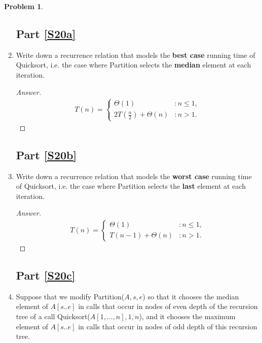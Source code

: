\documentclass[11pt]{article}
\theoremstyle{definition}
\theoremstyle{definition}
\newtheorem{required}{Problem}
\theoremstyle{definition}
\begin{document}
\begin{required}
\begin{enumerate}[label=(\alph*)]
\subsection{Part \ref{S20a}}

\item \label{S20a} Write down a recurrence relation that models the {\bf best case} running time of Quicksort, i.e. the case where {\sc Partition} selects the {\bf median} element at each iteration.

\begin{proof}[Answer]



\begin{align*}
T(n) = \begin{cases}
\text{$\Theta(1)$} & : n \leq 1, \\
\text{$2T(\frac{n}{2})+\Theta(n)$} & : n > 1.
\end{cases}
\end{align*}
\end{proof}


\newpage 
\subsection{Part \ref{S20b}}
\item \label{S20b} Write down a recurrence relation that models the {\bf worst case} running time of Quicksort, i.e. the case where {\sc Partition} selects the {\bf last} element at each iteration.

\begin{proof}[Answer]


\begin{align*}
T(n) = \begin{cases}
\text{$\Theta(1)$} & : n \leq 1, \\
\text{$T(n-1)+\Theta(n)$} & : n >1.
\end{cases}
\end{align*}
\end{proof}



\newpage
\subsection{Part \ref{S20c} }

\item \label{S20c} Suppose that we modify {\sc Partition}($A,s,e$) so that it chooses the median element of $A[s..e]$ in calls that occur in nodes of even depth of the recursion tree of a call {\sc Quicksort}($A[1, \ldots, n],1, n$), and it chooses the maximum element of $A[s..e]$ in calls that occur in nodes of odd depth of this recursion tree. \\
  

\end{enumerate}
\end{required}
\end{document}
